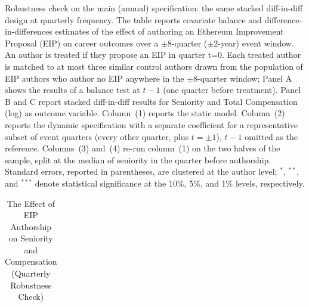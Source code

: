 \begin{center}
\begin{table}
 \caption{The Effect of EIP Authorship on Seniority and Compensation (Quarterly Robustness Check)}
 \label{tab:did_main_quarterly}
     \begin{small}
    \begin{minipage}{\textwidth}
      Robustness check on the main (annual) specification: the same stacked diff-in-diff design at quarterly frequency. The table reports covariate balance and difference-in-differences estimates of the effect of authoring an Ethereum Improvement Proposal (EIP) on career outcomes over a $\pm8$-quarter ($\pm2$-year) event window. An author is treated if they propose an EIP in quarter t=0. Each treated author is matched to at most three similar control authors drawn from the population of EIP authors who author no EIP anywhere in the $\pm8$-quarter window; Panel A shows the results of a balance test at $t-1$ (one quarter before treatment). Panel B and C report stacked diff-in-diff results for Seniority and Total Compensation (log) as outcome variable. Column~(1) reports the static model. Column~(2) reports the dynamic specification with a separate coefficient for a representative subset of event quarters (every other quarter, plus $t=\pm1$), $t-1$ omitted as the reference. Columns~(3) and~(4) re-run column~(1) on the two halves of the sample, split at the median of seniority in the quarter before authorship. Standard errors, reported in parentheses, are clustered at the author level; $^{*}$, $^{**}$, and $^{***}$ denote statistical significance at the 10\%, 5\%, and 1\% levels, respectively.
  \end{minipage}
         \end{small}
\begin{tabular}{lcccccc}
\\


\end{tabular}
\end{table}
\end{center}
